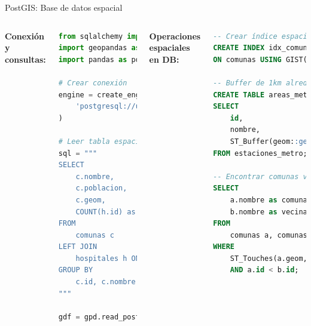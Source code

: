 \documentclass[10pt,aspectratio=169]{beamer}
\begin{document}
\begin{frame}[fragile]{PostGIS: Base de datos espacial}
    \begin{columns}[T]
        \textbf{Conexión y consultas:}
        \begin{lstlisting}[language=Python]
from sqlalchemy import create_engine
import geopandas as gpd
import pandas as pd

# Crear conexión
engine = create_engine(
    'postgresql://user:pass@localhost/geodata'
)

# Leer tabla espacial
sql = """
SELECT 
    c.nombre,
    c.poblacion,
    c.geom,
    COUNT(h.id) as num_hospitales
FROM 
    comunas c
LEFT JOIN 
    hospitales h ON ST_Contains(c.geom, h.geom)
GROUP BY 
    c.id, c.nombre, c.poblacion, c.geom
"""

gdf = gpd.read_postgis(sql, engine, 
                       geom_col='geom')
        \end{lstlisting}
        
        \textbf{Operaciones espaciales en DB:}
        \begin{lstlisting}[language=SQL]
-- Crear índice espacial
CREATE INDEX idx_comunas_geom 
ON comunas USING GIST(geom);

-- Buffer de 1km alrededor de metro
CREATE TABLE areas_metro AS
SELECT 
    id,
    nombre,
    ST_Buffer(geom::geography, 1000)::geometry as buffer
FROM estaciones_metro;

-- Encontrar comunas vecinas
SELECT 
    a.nombre as comuna,
    b.nombre as vecina
FROM 
    comunas a, comunas b
WHERE 
    ST_Touches(a.geom, b.geom)
    AND a.id < b.id;
        \end{lstlisting}
    \end{columns}
\end{frame}
\end{document}
